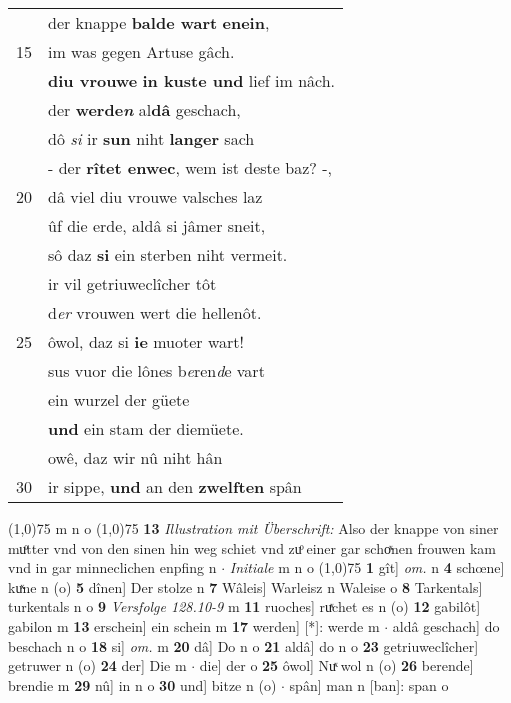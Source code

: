\documentclass[8pt,a4paper,notitlepage]{article}
\begin{document}
\begin{table}[ht]
\begin{minipage}[t]{0.5\linewidth}
\begin{tabular}{rl}
 & der knappe \textbf{balde wart} \textbf{enein},\\ 
15 & im was gegen Artuse gâch.\\ 
 & \textbf{diu vrouwe} \textbf{in kuste und} lief im nâch.\\ 
 & der \textbf{werde\textit{n}} al\textbf{dâ} geschach,\\ 
 & dô \textit{si} ir \textbf{sun} niht \textbf{langer} sach\\ 
 & - der \textbf{rîtet enwec}, wem ist deste baz? -,\\ 
20 & dâ viel diu vrouwe valsches laz\\ 
 & ûf die erde, aldâ si jâmer sneit,\\ 
 & sô daz \textbf{si} ein sterben niht vermeit.\\ 
 & ir vil getriuweclîcher tôt\\ 
 & d\textit{er} vrouwen wert die hellenôt.\\ 
25 & ôwol, daz si \textbf{ie} muoter wart!\\ 
 & sus vuor die lônes b\textit{e}ren\textit{d}e vart\\ 
 & ein wurzel der güete\\ 
 & \textbf{und} ein stam der diemüete.\\ 
 & owê, daz wir nû niht hân\\ 
30 & ir sippe, \textbf{und} an den \textbf{zwelften} spân\\ 
\end{tabular}
\scriptsize
\line(1,0){75} \newline
m n o \newline
\line(1,0){75} \newline
\textbf{13} \textit{Illustration mit Überschrift:} Also der knappe von siner muͦtter vnd von den sinen hin weg schiet vnd zuͦ einer gar schoͯnen frouwen kam vnd in gar minneclichen enpfing n   $\cdot$ \textit{Initiale} m n o  \newline
\line(1,0){75} \newline
\textbf{1} gît] \textit{om.} n \textbf{4} schœne] kuͯne n (o) \textbf{5} dînen] Der stolze n \textbf{7} Wâleis] Warleisz n Waleise o \textbf{8} Tarkentals] turkentals n o \textbf{9} \textit{Versfolge 128.10-9} m  \textbf{11} ruoches] ruͯchet es n (o) \textbf{12} gabilôt] gabilon m \textbf{13} erschein] ein schein m \textbf{17} werden] [*]: werde m  $\cdot$ aldâ geschach] do beschach n o \textbf{18} si] \textit{om.} m \textbf{20} dâ] Do n o \textbf{21} aldâ] do n o \textbf{23} getriuweclîcher] getruwer n (o) \textbf{24} der] Die m  $\cdot$ die] der o \textbf{25} ôwol] Nuͯ wol n (o) \textbf{26} berende] brendie m \textbf{29} nû] in n o \textbf{30} und] bitze n (o)  $\cdot$ spân] man n [ban]: span o \newline
\end{minipage}
\end{table}
\end{document}
